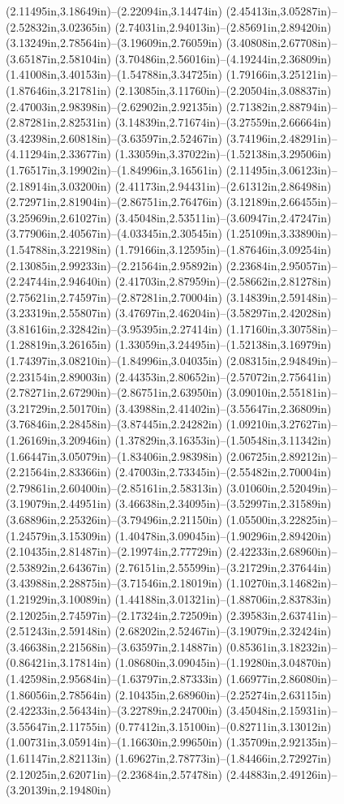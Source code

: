 (2.11495in,3.18649in)--(2.22094in,3.14474in) (2.45413in,3.05287in)--(2.52832in,3.02365in) (2.74031in,2.94013in)--(2.85691in,2.89420in) (3.13249in,2.78564in)--(3.19609in,2.76059in) (3.40808in,2.67708in)--(3.65187in,2.58104in) (3.70486in,2.56016in)--(4.19244in,2.36809in) (1.41008in,3.40153in)--(1.54788in,3.34725in) (1.79166in,3.25121in)--(1.87646in,3.21781in) (2.13085in,3.11760in)--(2.20504in,3.08837in) (2.47003in,2.98398in)--(2.62902in,2.92135in) (2.71382in,2.88794in)--(2.87281in,2.82531in) (3.14839in,2.71674in)--(3.27559in,2.66664in) (3.42398in,2.60818in)--(3.63597in,2.52467in) (3.74196in,2.48291in)--(4.11294in,2.33677in) (1.33059in,3.37022in)--(1.52138in,3.29506in) (1.76517in,3.19902in)--(1.84996in,3.16561in) (2.11495in,3.06123in)--(2.18914in,3.03200in) (2.41173in,2.94431in)--(2.61312in,2.86498in) (2.72971in,2.81904in)--(2.86751in,2.76476in) (3.12189in,2.66455in)--(3.25969in,2.61027in) (3.45048in,2.53511in)--(3.60947in,2.47247in) (3.77906in,2.40567in)--(4.03345in,2.30545in) (1.25109in,3.33890in)--(1.54788in,3.22198in) (1.79166in,3.12595in)--(1.87646in,3.09254in) (2.13085in,2.99233in)--(2.21564in,2.95892in) (2.23684in,2.95057in)--(2.24744in,2.94640in) (2.41703in,2.87959in)--(2.58662in,2.81278in) (2.75621in,2.74597in)--(2.87281in,2.70004in) (3.14839in,2.59148in)--(3.23319in,2.55807in) (3.47697in,2.46204in)--(3.58297in,2.42028in) (3.81616in,2.32842in)--(3.95395in,2.27414in) (1.17160in,3.30758in)--(1.28819in,3.26165in) (1.33059in,3.24495in)--(1.52138in,3.16979in) (1.74397in,3.08210in)--(1.84996in,3.04035in) (2.08315in,2.94849in)--(2.23154in,2.89003in) (2.44353in,2.80652in)--(2.57072in,2.75641in) (2.78271in,2.67290in)--(2.86751in,2.63950in) (3.09010in,2.55181in)--(3.21729in,2.50170in) (3.43988in,2.41402in)--(3.55647in,2.36809in) (3.76846in,2.28458in)--(3.87445in,2.24282in) (1.09210in,3.27627in)--(1.26169in,3.20946in) (1.37829in,3.16353in)--(1.50548in,3.11342in) (1.66447in,3.05079in)--(1.83406in,2.98398in) (2.06725in,2.89212in)--(2.21564in,2.83366in) (2.47003in,2.73345in)--(2.55482in,2.70004in) (2.79861in,2.60400in)--(2.85161in,2.58313in) (3.01060in,2.52049in)--(3.19079in,2.44951in) (3.46638in,2.34095in)--(3.52997in,2.31589in) (3.68896in,2.25326in)--(3.79496in,2.21150in) (1.05500in,3.22825in)--(1.24579in,3.15309in) (1.40478in,3.09045in)--(1.90296in,2.89420in) (2.10435in,2.81487in)--(2.19974in,2.77729in) (2.42233in,2.68960in)--(2.53892in,2.64367in) (2.76151in,2.55599in)--(3.21729in,2.37644in) (3.43988in,2.28875in)--(3.71546in,2.18019in) (1.10270in,3.14682in)--(1.21929in,3.10089in) (1.44188in,3.01321in)--(1.88706in,2.83783in) (2.12025in,2.74597in)--(2.17324in,2.72509in) (2.39583in,2.63741in)--(2.51243in,2.59148in) (2.68202in,2.52467in)--(3.19079in,2.32424in) (3.46638in,2.21568in)--(3.63597in,2.14887in) (0.85361in,3.18232in)--(0.86421in,3.17814in) (1.08680in,3.09045in)--(1.19280in,3.04870in) (1.42598in,2.95684in)--(1.63797in,2.87333in) (1.66977in,2.86080in)--(1.86056in,2.78564in) (2.10435in,2.68960in)--(2.25274in,2.63115in) (2.42233in,2.56434in)--(3.22789in,2.24700in) (3.45048in,2.15931in)--(3.55647in,2.11755in) (0.77412in,3.15100in)--(0.82711in,3.13012in) (1.00731in,3.05914in)--(1.16630in,2.99650in) (1.35709in,2.92135in)--(1.61147in,2.82113in) (1.69627in,2.78773in)--(1.84466in,2.72927in) (2.12025in,2.62071in)--(2.23684in,2.57478in) (2.44883in,2.49126in)--(3.20139in,2.19480in) 